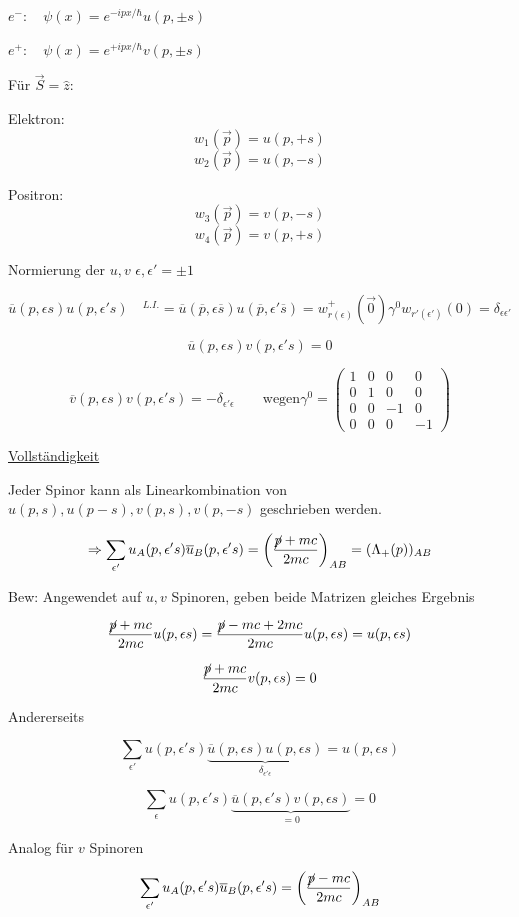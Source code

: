 \(e^-:\quad \psi(x) = e^{-ipx/\hbar}u(p,\pm s)\)

\(e^+:\quad \psi(x) = e^{+ipx/\hbar}v(p,\pm s)\)


Für \(\vec S = \hat z\):

Elektron:
\[w_1(\vec p) = u(p,+s)\]
\[w_2(\vec p) = u(p,-s)\]

Positron:
\[w_3(\vec p) = v(p,-s)\]
\[w_4(\vec p) = v(p,+s)\]

Normierung der \(u,v\) \(\epsilon,\epsilon' = \pm 1\)

\[\overline u(p,\epsilon s) u(p,\epsilon' s)\quad ^{L.I.}= \overline u(\overline p,\epsilon\overline s)  u(\overline p,\epsilon'\overline s) = w^+_{r(\epsilon)}(\vec 0)\gamma^0w_{r'(\epsilon')}(0) = \delta_{\epsilon\epsilon'}\]

\[\overline u(p,\epsilon s) v(p,\epsilon' s) = 0\]

\[\overline v(p,\epsilon s) v(p,\epsilon' s) =-\delta_{\epsilon'\epsilon}\qquad \text{wegen} \gamma^0 = \begin{pmatrix}1&0&0&0\\ 0&1&0&0\\0&0&-1&0\\0&0&0&-1\end{pmatrix} \]

\underline{Vollständigkeit}

Jeder Spinor kann als Linearkombination von \(u(p,s), u(p-s), v(p,s), v(p,-s)\) geschrieben werden.

\[\Rightarrow \sum_{\epsilon'} u_{A}(p,\epsilon's )\overline u_B(p,\epsilon' s) = \left(\frac{\cancel p +mc}{2mc}\right)_{AB} = (\Lambda_+(p))_{AB}\]

Bew: Angewendet auf \(u,v\) Spinoren, geben beide Matrizen gleiches Ergebnis

\[\frac{\cancel p + mc}{2mc} u(p,\epsilon s) =\frac{\cancel p -mc+2mc}{2mc} u(p,\epsilon s) = u(p,\epsilon s) \]


\[\frac{\cancel p + mc}{2mc} v(p,\epsilon s) = 0 \]


Andererseits

\[\sum_{\epsilon'} u(p,\epsilon' s)\underbrace{\overline u(p,\epsilon s) u(p,\epsilon s)}_{\delta_{\epsilon'\epsilon}} = u(p,\epsilon s)\]

\[\sum_{\epsilon} u(p,\epsilon' s)\underbrace{\overline u(p,\epsilon' s) v(p,\epsilon s)}_{=0} = 0\]


Analog für \(v\) Spinoren

\[ \sum_{\epsilon'} u_A(p,\epsilon' s) \overline u_B(p,\epsilon' s) = \left(\frac{\cancel p -mc}{2mc}\right)_{AB}\]


